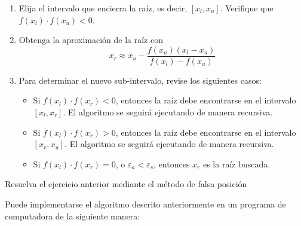 \begin{enumerate}
    
    \item Elija el intervalo que encierra la raíz, es decir, $[x_l, x_u]$.
        Verifique que $f(x_l) \cdot f(x_u) < 0$.

    \item Obtenga la aproximación de la raíz con
        \[
            x_r \approx x_u - \frac{f(x_u)(x_l-x_u)}{f(x_l) - f(x_u)}
        \]

    \item Para determinar el nuevo sub-intervalo, revise los siguientes casos:
        \begin{itemize}
            \item Si $f(x_l) \cdot f(x_r) < 0$, entonces la raíz debe
                encontrarse en el intervalo $[x_l, x_r]$. El algoritmo se
                seguirá ejecutando de manera recursiva.

            \item Si $f(x_l) \cdot f(x_r) > 0$, entonces la raíz debe
                encontrarse en el intervalo $[x_r, x_u]$. El algoritmo se
                seguirá ejecutando de manera recursiva.

            \item Si $f(x_l) \cdot f(x_r) = 0$, o \(\varepsilon_a <
                \varepsilon_s\), entonces $x_r$ es la raíz buscada.

        \end{itemize}
\end{enumerate}

\begin{ex}
    Resuelva el ejercicio anterior mediante el método de falsa posición
    
    \begin{solution}

        Puede implementarse el algoritmo descrito anteriormente en un
        programa de computadora de la siguiente manera:

        

        
    \end{solution}
\end{ex}

